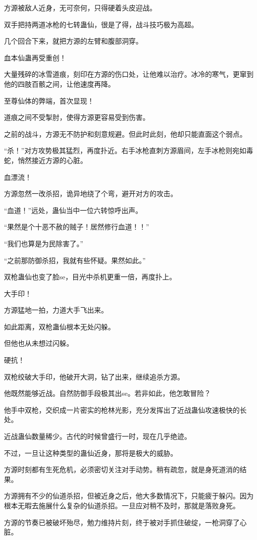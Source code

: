 \begin{this_body}
方源被敌人近身，无可奈何，只得硬着头皮迎战。

双手把持两道冰枪的七转蛊仙，很是了得，战斗技巧极为高超。

几个回合下来，就把方源的左臂和腹部洞穿。

血本仙蛊再受重创！

大量残碎的冰雪道痕，刻印在方源的伤口处，让他难以治疗。冰冷的寒气，更窜到他的四肢百骸之间，让他速度再降。

至尊仙体的弊端，首次显现！

道痕之间不受掣肘，使得方源更容易受到伤害。

之前的战斗，方源无不防护和刻意规避。但此时此刻，他却只能直面这个弱点。

“杀！”对方攻势极其猛烈，再度扑近。右手冰枪直刺方源眉间，左手冰枪则宛如毒蛇，悄然接近方源的心脏。

血漂流！

方源忽然一改杀招，诡异地绕了个弯，避开对方的攻击。

“血道！”远处，蛊仙当中一位六转惊呼出声。

“果然是个十恶不赦的贼子！居然修行血道！！”

“我们也算是为民除害了。”

“之前那防御杀招，我就有些怀疑。果然如此。”

双枪蛊仙也变了脸se，目光中杀机更重一倍，再度扑上。

大手印！

方源猛地一拍，力道大手飞出来。

如此距离，双枪蛊仙根本无处闪躲。

但他也从未想过闪躲。

硬抗！

双枪绞破大手印，他破开大洞，钻了出来，继续追杀方源。

他既然能够近战。自然防御手段极其出se。若非如此，他怎敢冒险？

他手中双枪，交织成一片密实的枪林光影，充分发挥出了近战蛊仙攻速极快的长处。

近战蛊仙数量稀少。古代的时候曾盛行一时，现在几乎绝迹。

不过，一旦让这种类型的蛊仙近身，那将是极大的威胁。

方源时刻都有生死危机，必须密切关注对手动势。稍有疏忽，就是身死道消的结果。

方源拥有不少的仙道杀招，但被近身之后，他大多数情况下，只能疲于躲闪。因为根本无暇去施展什么复杂的仙道杀招。一旦应对稍不及时，那就是落败身死。

方源的节奏已被破坏殆尽，勉力维持片刻，终于被对手抓住破绽，一枪洞穿了心脏。


\end{this_body}
